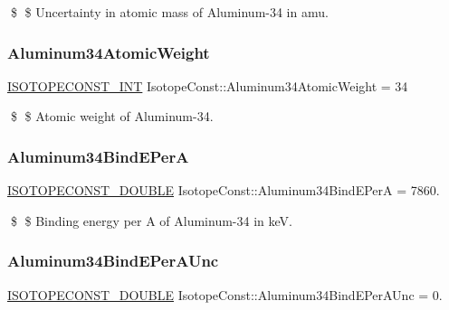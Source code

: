 \$ \$ Uncertainty in atomic mass of Aluminum-\/34 in amu. \mbox{\label{group___isotope_const-_aluminum-_al34_ga0c69a64663f66fc1c9231261a8279123}} 
\subsubsection{\texorpdfstring{Aluminum34\+Atomic\+Weight}{Aluminum34AtomicWeight}}
{\footnotesize\ttfamily \mbox{\hyperlink{group___isotope_const-_macros_ga5f18360b3e99483a35c32d789e62621c}{I\+S\+O\+T\+O\+P\+E\+C\+O\+N\+S\+T\+\_\+\+I\+NT}} Isotope\+Const\+::\+Aluminum34\+Atomic\+Weight = 34}

\$ \$ Atomic weight of Aluminum-\/34. \mbox{\label{group___isotope_const-_aluminum-_al34_ga7f9e97dcd5a95e1f482be18128a97454}} 
\subsubsection{\texorpdfstring{Aluminum34\+Bind\+E\+PerA}{Aluminum34BindEPerA}}
{\footnotesize\ttfamily \mbox{\hyperlink{group___isotope_const-_macros_ga8f45a7272ce02c0b4c65c44636ed719a}{I\+S\+O\+T\+O\+P\+E\+C\+O\+N\+S\+T\+\_\+\+D\+O\+U\+B\+LE}} Isotope\+Const\+::\+Aluminum34\+Bind\+E\+PerA = 7860.}

\$ \$ Binding energy per A of Aluminum-\/34 in keV. \mbox{\label{group___isotope_const-_aluminum-_al34_ga903caf7ec9ef95d4f0213f155ffb4d65}} 
\subsubsection{\texorpdfstring{Aluminum34\+Bind\+E\+Per\+A\+Unc}{Aluminum34BindEPerAUnc}}
{\footnotesize\ttfamily \mbox{\hyperlink{group___isotope_const-_macros_ga8f45a7272ce02c0b4c65c44636ed719a}{I\+S\+O\+T\+O\+P\+E\+C\+O\+N\+S\+T\+\_\+\+D\+O\+U\+B\+LE}} Isotope\+Const\+::\+Aluminum34\+Bind\+E\+Per\+A\+Unc = 0.}

